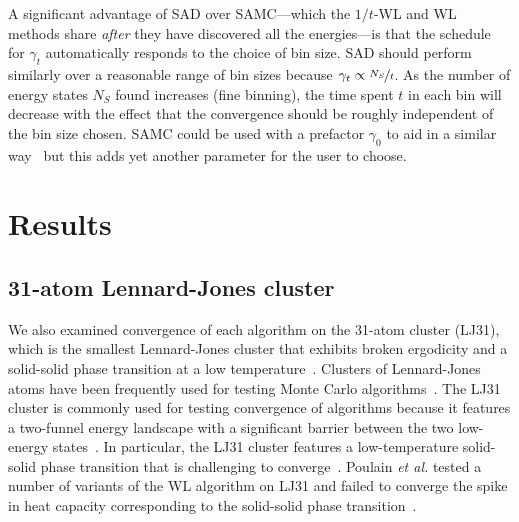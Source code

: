 \documentclass[letterpaper,twocolumn,amsmath,amssymb,pre,aps,10pt]{revtex4-1}
\begin{document}

A significant advantage of SAD over SAMC---which the $1/t$-WL and WL
methods share \emph{after} they have discovered all the energies---is that
the schedule for $\gamma_t$ automatically responds to the choice of bin
size.
SAD should perform similarly over a reasonable range of bin sizes
because $\gamma_t \propto \nicefrac{N_S}{t}$.  As the number of energy
states $N_S$ found increases (fine binning), the time spent $t$ in
each bin will decrease with the effect that the convergence should be
roughly independent of the bin size chosen.  SAMC could be used with a
prefactor $\gamma_0$ to aid in a similar
way~\cite{werlich2015stochastic} but this adds yet another parameter
for the user to choose.

\section{Results}\label{sec:results}

\subsection{31-atom Lennard-Jones cluster}

We also examined convergence of each algorithm on the 31-atom cluster
(LJ31), which is the smallest Lennard-Jones cluster that exhibits
broken ergodicity and a solid-solid phase transition at a low
temperature~\cite{doye1998thermodynamics,
  martiniani2014superposition}.  Clusters of Lennard-Jones atoms have
been frequently used for testing Monte Carlo
algorithms~\cite{wales1997global, neirotti2000phase,
  frantsuzov2005size, mandelshtam2006multiple}.  The LJ31 cluster
is commonly used for testing convergence of algorithms
because it features a two-funnel energy landscape with a significant
barrier between the two low-energy states~\cite{calvo2000entropic,
  calvo2000phase, poulain2006performances,
  martiniani2014superposition}.  In particular, the LJ31 cluster
features a low-temperature solid-solid phase transition that is challenging to
converge~\cite{mandelshtam2006multiple}.  Poulain \emph{et al.}
tested a number of variants of the WL algorithm on LJ31 and failed to
converge the spike in heat capacity corresponding to the solid-solid
phase transition~\cite{poulain2006performances}.
\end{document}
